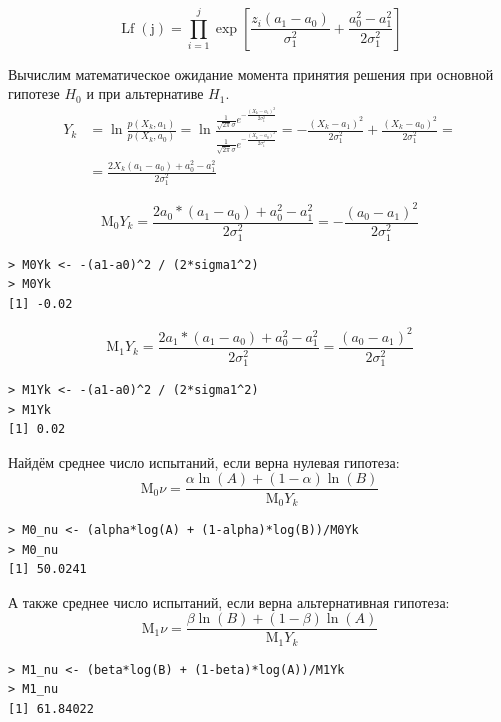 \documentclass[14pt,a4paper]{scrartcl}
\begin{document}
\begin{equation*}
	\operatorname{Lf}(\mathrm{j})=\prod_{i=1}^{j} \exp{\left[\frac{z_{i}(a_1-a_0)}{\sigma_1^{2}}+\frac{a_0^{2}-a_1^{2}}{2 \sigma_1^{2}}\right]}
\end{equation*}


Вычислим математическое ожидание момента принятия решения при основной гипотезе $H_0$ и при альтернативе $H_1$.
\begin{align*}
	Y_{k} &=  \ln \frac{p\left(X_{k}, a_1\right)}{p\left(X_{k}, a_0\right)}=\ln \frac{\frac{1}{\sqrt{2 \pi} \sigma}  e^{-\frac{\left(X_{k}-a_1\right)^{2}}{2 \sigma_1^{2}}}}{\frac{1}{\sqrt{2 \pi} \sigma}  e^{-\frac{\left(X_{k}-a_0\right)^{2}}{2 \sigma_1^{2}}}} = -\frac{\left(X_{k}-a_1\right)^{2}}{2 \sigma_1^{2}}+\frac{\left(X_{k}-a_0\right)^{2}}{2 \sigma_1^{2}}=\\
	&= \frac{2 X_{k}(a_1-a_0)+a_0^{2}-a_1^{2}}{2 \sigma_1^{2}}
\end{align*}

\begin{equation*}
	\mathrm{M_0}Y_k=\frac{2 a_0 *(a_1-a_0)+a_0^{2}-a_1^{2}}{2 \sigma_1^{2}}=-\frac{(a_0-a_1)^{2}}{2 \sigma_1^{2}}
\end{equation*}

\begin{lstlisting}
> M0Yk <- -(a1-a0)^2 / (2*sigma1^2)
> M0Yk
[1] -0.02
\end{lstlisting}


\begin{equation*}
\mathrm{M_1}Y_k=\frac{2 a_1 *(a_1-a_0)+a_0^{2}-a_1^{2}}{2 \sigma_1^{2}}=\frac{(a_0-a_1)^{2}}{2 \sigma_1^{2}}
\end{equation*}

\begin{lstlisting}
> M1Yk <- -(a1-a0)^2 / (2*sigma1^2)
> M1Yk
[1] 0.02
\end{lstlisting}

Найдём среднее число испытаний, если верна нулевая гипотеза:
\begin{equation*}
	\mathrm{M_0}\nu = \frac{\alpha \ln(A) + (1-\alpha)\ln(B)}{\mathrm{M_0}Y_k}
\end{equation*}
\begin{lstlisting}
> M0_nu <- (alpha*log(A) + (1-alpha)*log(B))/M0Yk
> M0_nu
[1] 50.0241
\end{lstlisting}

А также среднее число испытаний, если верна альтернативная гипотеза:
\begin{equation*}
\mathrm{M_1}\nu = \frac{\beta \ln(B) + (1-\beta)\ln(A)}{\mathrm{M_1}Y_k}
\end{equation*}
\begin{lstlisting}
> M1_nu <- (beta*log(B) + (1-beta)*log(A))/M1Yk
> M1_nu
[1] 61.84022
\end{lstlisting}
\end{document}
